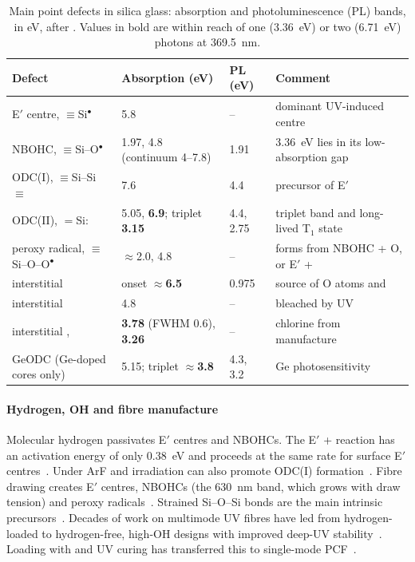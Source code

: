 \begin{table}[t]
\centering\small
\caption{Main point defects in silica glass: absorption and photoluminescence (PL) bands, in eV, after
\cite{Skuja1998,Skuja2011,Skuja2017,Girard2019}. Values in bold are within reach of one (\SI{3.36}{eV})
or two (\SI{6.71}{eV}) photons at \SI{369.5}{nm}.}
\label{tab:defects}
\begin{tabularx}{\textwidth}{@{}L{4.6cm} L{3.6cm} L{2.4cm} Y@{}}
\toprule
Defect & Absorption (eV) & PL (eV) & Comment \\
\midrule
E$'$ centre, $\equiv$Si$^{\bullet}$ & 5.8 & -- & dominant UV-induced centre \\
NBOHC, $\equiv$Si--O$^{\bullet}$ & 1.97, 4.8 (continuum 4--7.8) & 1.91 & \SI{3.36}{eV} lies in its low-absorption gap \\
ODC(I), $\equiv$Si--Si$\equiv$ & 7.6 & 4.4 & precursor of E$'$ \\
ODC(II), $=$Si: & 5.05, \textbf{6.9}; triplet \textbf{3.15} & 4.4, 2.75 & triplet band and long-lived T$_1$ state \\
peroxy radical, $\equiv$Si--O--O$^{\bullet}$ & $\approx$2.0, 4.8 & -- & forms from NBOHC + O, or E$'$ + \Oxy{} \\
interstitial \Oxy{} & onset \textbf{$\approx$6.5} & 0.975 & source of O atoms and  \\
interstitial  & 4.8 & -- & bleached by UV \\
interstitial ,  & \textbf{3.78} (FWHM 0.6), \textbf{3.26} & -- & chlorine from manufacture \\
GeODC (Ge-doped cores only) & 5.15; triplet \textbf{$\approx$3.8} & 4.3, 3.2 & Ge photosensitivity \\
\bottomrule
\end{tabularx}
\end{table}

\paragraph{Hydrogen, OH and fibre manufacture} Molecular hydrogen passivates E$'$ centres and NBOHCs. The
E$'$ + \Htwo{} reaction has an activation energy of only \SI{0.38}{eV} and proceeds at the same rate for
surface E$'$ centres~\cite{Radzig1995,Messina2007}. Under ArF and  irradiation \Htwo{} can also
promote ODC(I) formation~\cite{Ikuta2002}. Fibre drawing creates E$'$ centres, NBOHCs (the \SI{630}{nm}
band, which grows with draw tension) and peroxy radicals~\cite{Hanafusa1985,Hibino1986,Hibino1987}.
Strained Si--O--Si bonds are the main intrinsic precursors~\cite{Kajihara2008b}. Decades of work on
multimode UV fibres have led from hydrogen-loaded to hydrogen-free, high-OH designs with improved deep-UV
stability~\cite{Karlitschek1995,Karlitschek1998a,Klein2001,Khalilov2006,KleinKhalilov2015}. Loading with
\Htwo{} and UV curing has transferred this to single-mode PCF~\cite{Colombe2014}.

